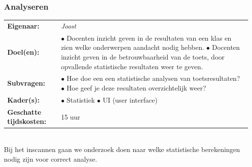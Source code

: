 \documentclass[12pt]{article}
\begin{document}
\pagebreak

\subsubsection{Analyseren}
\begin{tabularx}{\linewidth}{@{}ll}
    \textbf{Eigenaar: } & \textit{Joost} \\
    \textbf{Doel(en): } & 
        \makecell[tl]{
            $\bullet$ Docenten inzicht geven in de resultaten van een klas en zien welke \\onderwerpen aandacht nodig hebben.\\
            $\bullet$ Docenten inzicht geven in de betrouwbaarheid van de toets, door opvallende \\ statistische resultaten weer te geven.\\
        } \\
    \textbf{Subvragen: } & 
        \makecell[tl]{
            $\bullet$ Hoe doe een een statistische analysen van toetsresultaten? \\
            $\bullet$ Hoe geef je deze resultaten overzichtelijk weer? \\
        }\\
    \textbf{Kader(s): } & 
        \makecell[tl]{
            $\bullet$ Statistiek \\
            $\bullet$ UI (user interface) \\
        }\\
    \parbox[t]{3cm}{\raggedright \textbf{Geschatte  tijdskosten:} } & 15 uur \\
\end{tabularx}
\\
Bij het inscannen gaan we onderzoek doen naar welke statistische berekeningen nodig zijn voor correct analyse. 
\pagebreak
\end{document}
